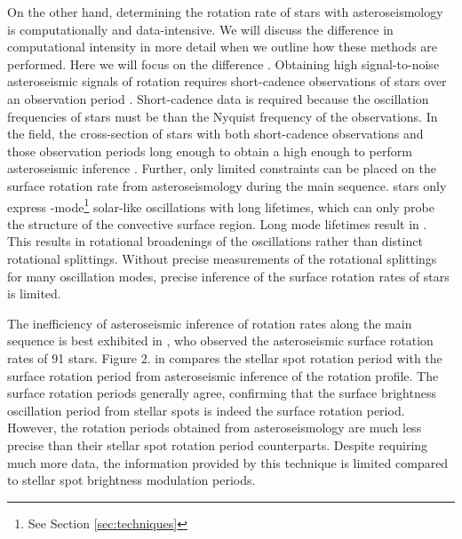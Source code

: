 On the other hand, determining the rotation rate of stars with asteroseismology is computationally and data-intensive.
We will discuss the difference in computational intensity in more detail when we outline how these methods are performed.
Here we will focus on the difference .
Obtaining high signal-to-noise asteroseismic signals of rotation requires short-cadence observations of stars over an observation period  \citep{deheuvels_seismic_2014}.
Short-cadence data is required because the oscillation frequencies of stars must be  than the Nyquist frequency of the observations.
In the \kepler{} field, the cross-section of stars with both short-cadence observations and those observation periods long enough to obtain a high enough  to perform asteroseismic inference .
Further, only limited constraints can be placed on the surface rotation rate from asteroseismology during the main sequence.
 stars only express -mode\footnote{See Section \ref{sec:techniques}} solar-like oscillations with long lifetimes, which can only probe the structure of the convective surface region.
Long mode lifetimes result in .
This results in rotational broadenings of the oscillations rather than distinct rotational splittings.
Without precise measurements of the rotational splittings for many oscillation modes, precise inference of the surface rotation rates of stars is limited.

The inefficiency of asteroseismic inference of rotation rates along the main sequence is best exhibited in \citet{hall_weakened_2021}, who observed the asteroseismic surface rotation rates of 91  stars.
Figure 2. in \citet{hall_weakened_2021} compares the stellar spot rotation period with the surface rotation period from asteroseismic inference of the rotation profile.
The surface rotation periods generally agree, confirming that the surface brightness oscillation period from stellar spots is indeed the surface rotation period.
However, the rotation periods obtained from asteroseismology are much less precise than their stellar spot rotation period counterparts.
Despite requiring much more data, the information provided by this technique is limited compared to stellar spot brightness modulation periods.

